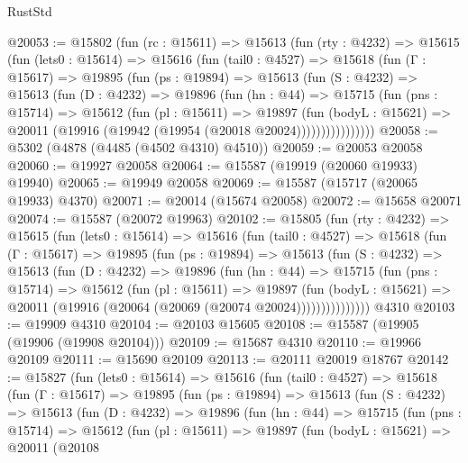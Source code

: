 \begin{lexlean}{RustStd}
\begin{coremodule}
@20053 := @15802
    (fun (rc : @15611) =>
    @15613
      (fun (rty : @4232) =>
      @15615
        (fun (lets0 : @15614) =>
        @15616
          (fun (tail0 : @4527) =>
          @15618
            (fun (Γ : @15617) =>
            @19895
              (fun (ps : @19894) =>
              @15613
                (fun (S : @4232) =>
                @15613
                  (fun (D : @4232) =>
                  @19896
                    (fun (hn : @44) =>
                    @15715
                      (fun (pns : @15714) =>
                      @15612
                        (fun (pl : @15611) =>
                        @19897
                          (fun (bodyL : @15621) =>
                          @20011 (@19916 (@19942 (@19954 (@20018 @20024))))))))))))))))
@20058 := @5302 (@4878 (@4485 (@4502 @4310) @4510))
@20059 := @20053 @20058
@20060 := @19927 @20058
@20064 := @15587 (@19919 (@20060 @19933) @19940)
@20065 := @19949 @20058
@20069 := @15587 (@15717 (@20065 @19933) @4370)
@20071 := @20014 (@15674 @20058)
@20072 := @15658 @20071
@20074 := @15587 (@20072 @19963)
@20102 := @15805
    (fun (rty : @4232) =>
    @15615
      (fun (lets0 : @15614) =>
      @15616
        (fun (tail0 : @4527) =>
        @15618
          (fun (Γ : @15617) =>
          @19895
            (fun (ps : @19894) =>
            @15613
              (fun (S : @4232) =>
              @15613
                (fun (D : @4232) =>
                @19896
                  (fun (hn : @44) =>
                  @15715
                    (fun (pns : @15714) =>
                    @15612
                      (fun (pl : @15611) =>
                      @19897
                        (fun (bodyL : @15621) =>
                        @20011 (@19916 (@20064 (@20069 (@20074 @20024)))))))))))))))
    @4310
@20103 := @19909 @4310
@20104 := @20103 @15605
@20108 := @15587 (@19905 (@19906 (@19908 @20104)))
@20109 := @15687 @4310
@20110 := @19966 @20109
@20111 := @15690 @20109
@20113 := @20111 @20019 @18767
@20142 := @15827
    (fun (lets0 : @15614) =>
    @15616
      (fun (tail0 : @4527) =>
      @15618
        (fun (Γ : @15617) =>
        @19895
          (fun (ps : @19894) =>
          @15613
            (fun (S : @4232) =>
            @15613
              (fun (D : @4232) =>
              @19896
                (fun (hn : @44) =>
                @15715
                  (fun (pns : @15714) =>
                  @15612
                    (fun (pl : @15611) =>
                    @19897
                      (fun (bodyL : @15621) =>
                      @20011
                        (@20108

\end{coremodule}
\end{lexlean}
